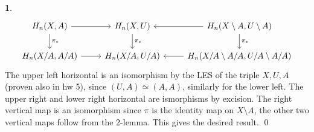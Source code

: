 \documentclass[10.5pt]{article}
\theoremstyle{definition}
\newtheorem{pb}{}
\begin{document}
\begin{pb}
        \begin{equation*}
            \begin{tikzcd}
                H_n(X,A) \arrow[d,"\pi_*"] \arrow[r,""] &H_n(X,U) \arrow[d,"\pi_*"]  &H_n(X\setminus A, U \setminus A)\arrow[l,""] \arrow[d,"\pi_*"] \\
                H_n(X/A,A/A) \arrow[r,""] &H_n(X/A,U/A)  &H_n(X/A\setminus A/A, U/A \setminus A/A)\arrow[l,""]
            \end{tikzcd}
        \end{equation*}
        The upper left horizontal is an isomorphism by the LES of the triple \(X,U,A\) (proven also in hw 5), since \((U,A) \simeq (A,A)\), similarly for the lower left. The upper right and lower right horizontal are ismorphisms by excision. The right vertical map is an isomorphism since \(\pi\) is the identity map on \(X \setminus A\), the other two vertical maps follow from the 2-lemma. This gives the desired result. \qed


\end{pb}
\end{document}
